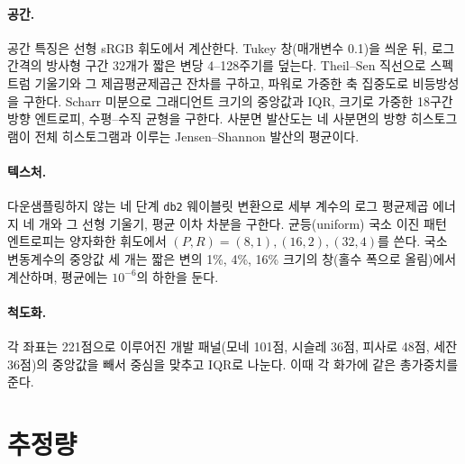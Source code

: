 \paragraph{공간.} 공간 특징은 선형 sRGB 휘도에서 계산한다. Tukey 창(매개변수 0.1)을 씌운 뒤, 로그
간격의 방사형 구간 32개가 짧은 변당 4--128주기를 덮는다. Theil--Sen 직선으로 스펙트럼 기울기와 그
제곱평균제곱근 잔차를 구하고, 파워로 가중한 축 집중도로 비등방성을 구한다. Scharr 미분으로 그래디언트
크기의 중앙값과 IQR, 크기로 가중한 18구간 방향 엔트로피, 수평--수직 균형을 구한다. 사분면 발산도는 네
사분면의 방향 히스토그램이 전체 히스토그램과 이루는 Jensen--Shannon 발산의 평균이다.

\paragraph{텍스처.} 다운샘플링하지 않는 네 단계 \texttt{db2} 웨이블릿 변환\citep{mallat1989wavelet}으로
세부 계수의 로그 평균제곱 에너지 네 개와 그 선형 기울기, 평균 이차 차분을 구한다. 균등(uniform) 국소
이진 패턴 엔트로피\citep{ojala2002lbp}는 양자화한 휘도에서 $(P,R)=(8,1),(16,2),(32,4)$를 쓴다. 국소
변동계수의 중앙값 세 개는 짧은 변의 1\%, 4\%, 16\% 크기의 창(홀수 폭으로 올림)에서 계산하며, 평균에는
$10^{-6}$의 하한을 둔다.

\paragraph{척도화.} 각 좌표는 221점으로 이루어진 개발 패널(모네 101점, 시슬레 36점, 피사로 48점, 세잔
36점)의 중앙값을 빼서 중심을 맞추고 IQR로 나눈다. 이때 각 화가에 같은 총가중치를 준다.

\FloatBarrier
\section{추정량}\label{app:estimators}

